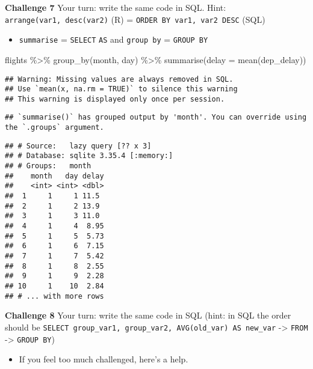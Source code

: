 \documentclass[
]{book}
\newenvironment{Shaded}{\begin{snugshade}}{\end{snugshade}}
\newcommand{\AttributeTok}[1]{\textcolor[rgb]{0.77,0.63,0.00}{#1}}
\newcommand{\FunctionTok}[1]{\textcolor[rgb]{0.00,0.00,0.00}{#1}}
\newcommand{\NormalTok}[1]{#1}
\newcommand{\SpecialCharTok}[1]{\textcolor[rgb]{0.00,0.00,0.00}{#1}}
\providecommand{\tightlist}{%
  \setlength{\itemsep}{0pt}\setlength{\parskip}{0pt}}
\begin{document}
\textbf{Challenge 7}
Your turn: write the same code in SQL.
Hint: \texttt{arrange(var1,\ desc(var2)} (R) = \texttt{ORDER\ BY\ var1,\ var2\ DESC} (SQL)

\begin{itemize}
\tightlist
\item
  \texttt{summarise} = \texttt{SELECT} \texttt{AS} and \texttt{group\ by} = \texttt{GROUP\ BY}
\end{itemize}

\begin{Shaded}
\begin{Highlighting}[]
\NormalTok{flights }\SpecialCharTok{\%\textgreater{}\%}
  \FunctionTok{group\_by}\NormalTok{(month, day) }\SpecialCharTok{\%\textgreater{}\%}
  \FunctionTok{summarise}\NormalTok{(}\AttributeTok{delay =} \FunctionTok{mean}\NormalTok{(dep\_delay)) }
\end{Highlighting}
\end{Shaded}

\begin{verbatim}
## Warning: Missing values are always removed in SQL.
## Use `mean(x, na.rm = TRUE)` to silence this warning
## This warning is displayed only once per session.
\end{verbatim}

\begin{verbatim}
## `summarise()` has grouped output by 'month'. You can override using the `.groups` argument.
\end{verbatim}

\begin{verbatim}
## # Source:   lazy query [?? x 3]
## # Database: sqlite 3.35.4 [:memory:]
## # Groups:   month
##    month   day delay
##    <int> <int> <dbl>
##  1     1     1 11.5 
##  2     1     2 13.9 
##  3     1     3 11.0 
##  4     1     4  8.95
##  5     1     5  5.73
##  6     1     6  7.15
##  7     1     7  5.42
##  8     1     8  2.55
##  9     1     9  2.28
## 10     1    10  2.84
## # ... with more rows
\end{verbatim}

\textbf{Challenge 8}
Your turn: write the same code in SQL (hint: in SQL the order should be \texttt{SELECT\ group\_var1,\ group\_var2,\ AVG(old\_var)\ AS\ new\_var} -\textgreater{} \texttt{FROM} -\textgreater{} \texttt{GROUP\ BY})

\begin{itemize}
\tightlist
\item
  If you feel too much challenged, here's a help.
\end{itemize}
\end{document}
